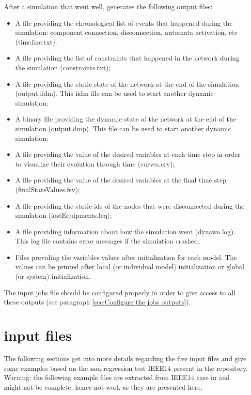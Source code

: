 \documentclass[a4paper, 12pt]{report}
\begin{document}
After a simulation that went well, \Dynawo generates the following output files:
\begin{itemize}
\item A file providing the chronological list of events that happened during the simulation: component connection, disconnection, automata activation, etc (timeline.txt).
\item A file providing the list of constraints that happened in the network during the simulation (constraints.txt);
\item A file providing the static state of the network at the end of the simulation (output.iidm). This iidm file can be used to start another dynamic simulation;
\item A binary file providing the dynamic state of the network at the end of the simulation (output.dmp). This file can be used to start another dynamic simulation;
\item A file providing the value of the desired variables at each time step in order to visualize their evolution through time (curves.crv);
\item A file providing the value of the desired variables at the final time step (finalStateValues.fsv);
\item A file providing the static ids of the nodes that were disconnected during the simulation (lostEquipments.leq);
\item A file providing information about how the simulation went (dynawo.log). This log file contains error messages if the simulation crashed;
\item Files providing the variables values after initialization for each model. The values can be printed after local (or individual model) initialization or global (or system) initialization.
\end{itemize}

The input jobs file should be configured properly in order to give access to all these outputs (see paragraph \ref{sec:Configure the jobs outputs}).

\section[Dynawo input files]{\Dynawo input files}

The following sections get into more details regarding the five input files and give some examples based on the non-regression test IEEE14 present in the \Dynawo repository. \\
Warning: the following example files are extracted from IEEE14 case in \Dynawo and might not be complete, hence not work as they are presented here.
\end{document}
